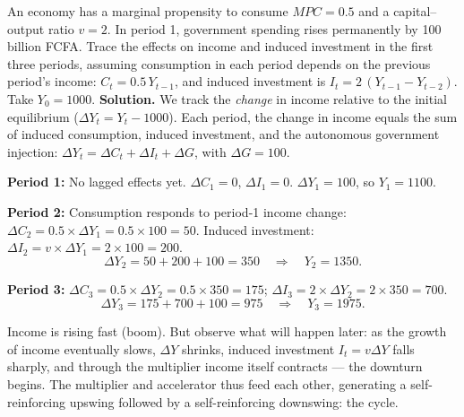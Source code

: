\documentclass[11pt]{article}
\begin{document}
\begin{exoresolu}
An economy has a marginal propensity to consume $MPC = 0.5$ and a capital--output ratio $v = 2$. In period 1, government spending rises permanently by 100 billion FCFA. Trace the effects on income and induced investment in the first three periods, assuming consumption in each period depends on the previous period's income: $C_t = 0.5\,Y_{t-1}$, and induced investment is $I_t = 2\,(Y_{t-1} - Y_{t-2})$. Take $Y_0 = 1000$.
\tcblower
\textbf{Solution.} We track the \emph{change} in income relative to the initial equilibrium ($\Delta Y_t = Y_t - 1000$). Each period, the change in income equals the sum of induced consumption, induced investment, and the autonomous government injection: $\Delta Y_t = \Delta C_t + \Delta I_t + \Delta G$, with $\Delta G = 100$.

\textbf{Period 1:} No lagged effects yet. $\Delta C_1 = 0$, $\Delta I_1 = 0$. $\Delta Y_1 = 100$, so $Y_1 = 1100$.

\textbf{Period 2:} Consumption responds to period-1 income change: $\Delta C_2 = 0.5 \times \Delta Y_1 = 0.5 \times 100 = 50$. Induced investment: $\Delta I_2 = v \times \Delta Y_1 = 2 \times 100 = 200$.
\[ \Delta Y_2 = 50 + 200 + 100 = 350 \quad\Rightarrow\quad Y_2 = 1350. \]

\textbf{Period 3:} $\Delta C_3 = 0.5 \times \Delta Y_2 = 0.5 \times 350 = 175$; $\Delta I_3 = 2 \times \Delta Y_2 = 2 \times 350 = 700$.
\[ \Delta Y_3 = 175 + 700 + 100 = 975 \quad\Rightarrow\quad Y_3 = 1975. \]

Income is rising fast (boom). But observe what will happen later: as the growth of income eventually slows, $\Delta Y$ shrinks, induced investment $I_t = v\Delta Y$ falls sharply, and through the multiplier income itself contracts --- the downturn begins. The multiplier and accelerator thus feed each other, generating a self-reinforcing upswing followed by a self-reinforcing downswing: the cycle.
\end{exoresolu}
\end{document}
